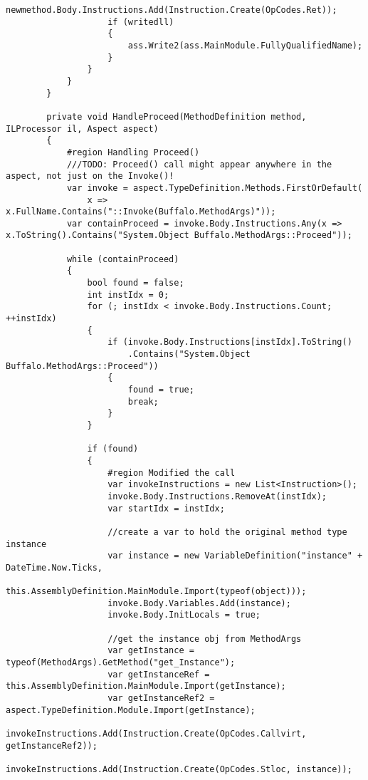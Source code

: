 \begin{lstlisting}[caption={../buffalo/Injectors/MethodAroundInjector.cs}, label=../buffalo/Injectors/MethodAroundInjector.cs, frame=tb, basicstyle=\scriptsize]
                    newmethod.Body.Instructions.Add(Instruction.Create(OpCodes.Ret));
                    if (writedll)
                    {
                        ass.Write2(ass.MainModule.FullyQualifiedName);
                    }
                }
            }
        }

        private void HandleProceed(MethodDefinition method, ILProcessor il, Aspect aspect)
        {
            #region Handling Proceed()
            ///TODO: Proceed() call might appear anywhere in the aspect, not just on the Invoke()!
            var invoke = aspect.TypeDefinition.Methods.FirstOrDefault(
                x => x.FullName.Contains("::Invoke(Buffalo.MethodArgs)"));
            var containProceed = invoke.Body.Instructions.Any(x => x.ToString().Contains("System.Object Buffalo.MethodArgs::Proceed"));

            while (containProceed)
            {
                bool found = false;
                int instIdx = 0;
                for (; instIdx < invoke.Body.Instructions.Count; ++instIdx)
                {
                    if (invoke.Body.Instructions[instIdx].ToString()
                        .Contains("System.Object Buffalo.MethodArgs::Proceed"))
                    {
                        found = true;
                        break;
                    }
                }

                if (found)
                {
                    #region Modified the call
                    var invokeInstructions = new List<Instruction>();
                    invoke.Body.Instructions.RemoveAt(instIdx);
                    var startIdx = instIdx;

                    //create a var to hold the original method type instance
                    var instance = new VariableDefinition("instance" + DateTime.Now.Ticks,
                        this.AssemblyDefinition.MainModule.Import(typeof(object)));
                    invoke.Body.Variables.Add(instance);
                    invoke.Body.InitLocals = true;

                    //get the instance obj from MethodArgs
                    var getInstance = typeof(MethodArgs).GetMethod("get_Instance");
                    var getInstanceRef = this.AssemblyDefinition.MainModule.Import(getInstance);
                    var getInstanceRef2 = aspect.TypeDefinition.Module.Import(getInstance);
                    invokeInstructions.Add(Instruction.Create(OpCodes.Callvirt, getInstanceRef2));
                    invokeInstructions.Add(Instruction.Create(OpCodes.Stloc, instance));


\end{lstlisting}
